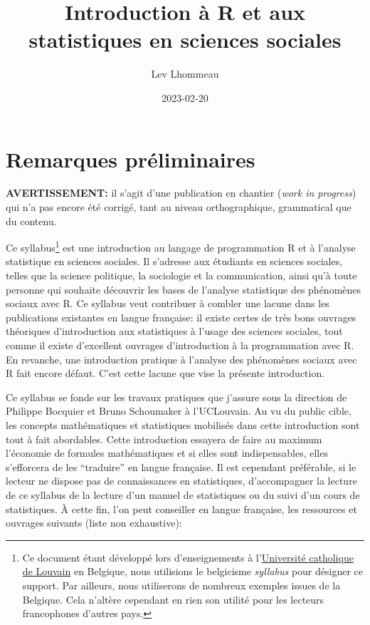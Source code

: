 \documentclass[
]{book}
\title{Introduction à R et aux statistiques en sciences sociales}
\author{Lev Lhommeau}
\date{2023-02-20}
\begin{document}
\maketitle

{
\setcounter{tocdepth}{1}
\tableofcontents
}
\hypertarget{remarques-pruxe9liminaires}{%
\chapter{Remarques préliminaires}\label{remarques-pruxe9liminaires}}

\textbf{AVERTISSEMENT:} il s'agit d'une publication en chantier (\emph{work in progress}) qui n'a pas encore été corrigé, tant au niveau orthographique, grammatical que du contenu.

Ce syllabus\footnote{Ce document étant développé lors d'enseignements à l'\href{https://uclouvain.be/}{Université catholique de Louvain} en Belgique, nous utilisions le belgicisme \emph{syllabus} pour désigner ce support. Par ailleurs, nous utiliserons de nombreux exemples issues de la Belgique. Cela n'altère cependant en rien son utilité pour les lecteurs francophones d'autres pays.} est une introduction au langage de programmation R et à l'analyse statistique en sciences sociales. Il s'adresse aux étudiants en sciences sociales, telles que la science politique, la sociologie et la communication, ainsi qu'à toute personne qui souhaite découvrir les bases de l'analyse statistique des phénomènes sociaux avec R. Ce syllabus veut contribuer à combler une lacune dans les publications existantes en langue française: il existe certes de très bons ouvrages théoriques d'introduction aux statistiques à l'usage des sciences sociales, tout comme il existe d'excellent ouvrages d'introduction à la programmation avec R. En revanche, une introduction pratique à l'analyse des phénomènes sociaux avec R fait encore défaut. C'est cette lacune que vise la présente introduction.

Ce syllabus se fonde sur les travaux pratiques que j'assure sous la direction de Philippe Bocquier et Bruno Schoumaker à l'UCLouvain. Au vu du public cible, les concepts mathématiques et statistiques mobilisés dans cette introduction sont tout à fait abordables. Cette introduction essayera de faire au maximum l'économie de formules mathématiques et si elles sont indispensables, elles s'efforcera de les ``traduire'' en langue française. Il est cependant préférable, si le lecteur ne dispose pas de connaissances en statistiques, d'accompagner la lecture de ce syllabus de la lecture d'un manuel de statistiques ou du suivi d'un cours de statistiques. À cette fin, l'on peut conseiller en langue française, les ressources et ouvrages suivants (liste non exhaustive):
\end{document}
